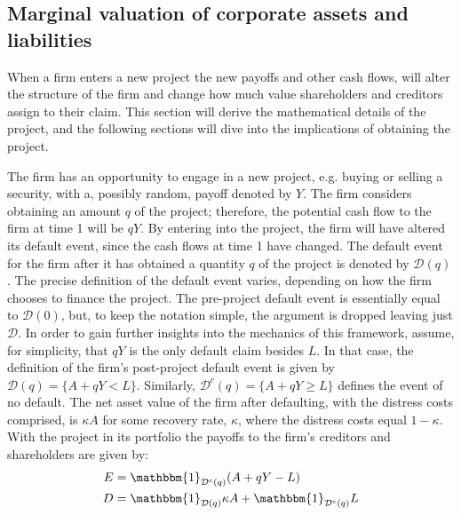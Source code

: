 \documentclass[../main.tex]{subfiles}
\begin{document}
    \subsection{Marginal valuation of corporate assets and liabilities}
        When a firm enters a new project the new payoffs and other cash flows,
        will alter the structure of the firm and
        change how much value shareholders and creditors assign to their claim.
        This section will derive the mathematical details of the project,
        and the following sections will dive into the implications of obtaining the project.

        The firm has an opportunity to engage in a new project, e.g. buying or selling a security,
        with a, possibly random, payoff denoted by $Y$.
        The firm considers obtaining an amount $q$ of the project;
        therefore, the potential cash flow to the firm at time 1 will be $qY$.
        By entering into the project, the firm will have altered its default event,
        since the cash flows at time 1 have changed.
        The default event for the firm after it has obtained a quantity $q$ of the project
        is denoted by $\mathcal{D}(q)$.
        The precise definition of the default event varies, 
        depending on how the firm chooses to finance the project.
        The pre-project default event is essentially equal to $\mathcal{D}(0)$,
        but, to keep the notation simple, the argument is dropped leaving just $\mathcal{D}$.
        In order to gain further insights into the mechanics of this framework, 
        assume, for simplicity, that $qY$ is the only default claim besides $L$. 
        In that case, the definition of the firm's post-project default event is given by 
        $\mathcal{D}(q) = \{A + qY < L\}$.
        Similarly, $\mathcal{D}^{c}(q) = \{A + qY \geq L\}$ defines the event of no default.
        The net asset value of the firm after defaulting, with the distress costs comprised, is $\kappa A$ for some recovery rate, $\kappa$, where the distress costs equal $1-\kappa$.
        With the project in its portfolio the payoffs to the firm's creditors and shareholders are given by:
            \begin{align*}
                E
                &= 
                \mathbbm{1}_{\mathcal{D}^{c}(q)}
                (A + qY - L)
                \\
                D 
                &= 
                \mathbbm{1}_{\mathcal{D}(q)}
                \kappa A 
                + 
                \mathbbm{1}_{\mathcal{D}^{c}(q)} 
                L
            \end{align*}
\end{document}
